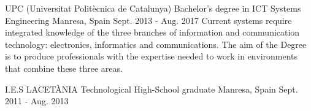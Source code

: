

\begin{cventries}

  \cventry
    {UPC (Universitat Politècnica de Catalunya)} %
    {Bachelor's degree in ICT Systems Engineering} %
    {Manresa, Spain} %
    {Sept. 2013 - Aug. 2017} %
    {
      Current systems require integrated knowledge of the three branches of information and communication technology: electronics, informatics and communications. The aim of the Degree is to produce professionals with the expertise needed to work in environments that combine these three areas.
    }

\cventry
    {I.E.S LACETÀNIA} %
    {Technological High-School graduate} %
    {Manresa, Spain} %
    {Sept. 2011 - Aug. 2013} %
    {}


\end{cventries}
